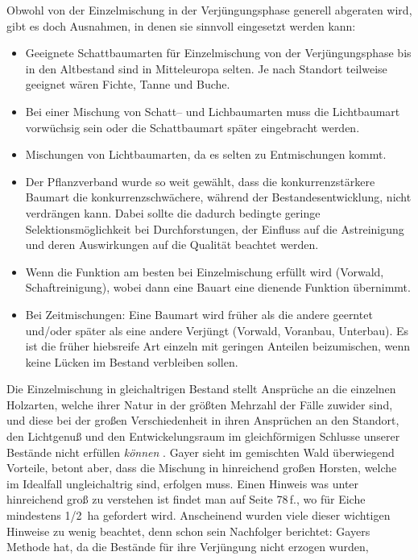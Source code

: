\documentclass[twocolumn]{scrartcl}
\begin{document}
Obwohl von der Einzelmischung in der Verjüngungsphase generell
abgeraten wird, gibt es doch Ausnahmen, in denen sie sinnvoll
eingesetzt werden kann:
\begin{itemize}
\item Geeignete Schattbaumarten für Einzelmischung von der
  Verjüngungsphase bis in den Altbestand sind in Mitteleuropa
  selten. Je nach Standort teilweise geeignet wären Fichte, Tanne und
  Buche.
\item Bei einer Mischung von Schatt-- und Lichbaumarten muss die
  Lichtbaumart vorwüchsig sein oder die Schattbaumart später
  eingebracht werden.
\item Mischungen von Lichtbaumarten, da es selten zu Entmischungen
  kommt.
\item Der Pflanzverband wurde so weit gewählt, dass die
  konkurrenzstärkere Baumart die konkurrenzschwächere, während der
  Bestandesentwicklung, nicht verdrängen kann. Dabei sollte die
  dadurch bedingte geringe Selektionsmöglichkeit bei Durchforstungen,
  der Einfluss auf die Astreinigung und deren Auswirkungen auf die
  Qualität beachtet werden.
\item Wenn die Funktion am besten bei Einzelmischung erfüllt wird
  (Vorwald, Schaftreinigung), wobei dann eine Bauart eine dienende
  Funktion übernimmt.
\item Bei Zeitmischungen: Eine Baumart wird früher als die andere
  geerntet und/oder später als eine andere Verjüngt (Vorwald,
  Voranbau, Unterbau). Es ist die früher hiebsreife Art einzeln mit
  geringen Anteilen beizumischen, wenn keine Lücken im Bestand
  verbleiben sollen.
\end{itemize}
\frqq Die Einzelmischung in gleichaltrigen Bestand stellt Ansprüche an
die einzelnen Holzarten, welche ihrer Natur in der größten Mehrzahl
der Fälle zuwider sind, und diese bei der großen Verschiedenheit in
ihren Ansprüchen an den Standort, den Lichtgenuß und den
Entwickelungsraum im gleichförmigen Schlusse unserer Bestände nicht
erfüllen \emph{können}\flqq{}
\citep[S.~147]{gayer1886DerGemischteWald}. Gayer sieht im gemischten
Wald überwiegend Vorteile, betont aber, dass die Mischung in
hinreichend großen Horsten, welche im Idealfall ungleichaltrig sind,
erfolgen muss. Einen Hinweis was unter hinreichend groß zu verstehen ist
findet man auf Seite 78\,f., wo für Eiche mindestens 1/2~ha gefordert
wird. Anscheinend wurden viele dieser wichtigen Hinweise zu wenig
beachtet, denn schon sein Nachfolger berichtet: \frqq Gayers Methode
hat, da die Bestände für ihre Verjüngung nicht erzogen wurden,
\end{document}
